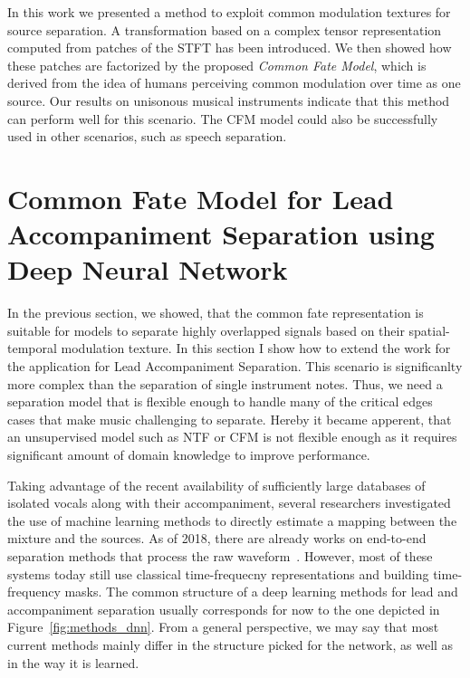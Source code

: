 In this work we presented a method to exploit common modulation textures for source separation. A transformation based on a complex tensor representation computed from patches of the STFT has been introduced. We then showed how these patches are factorized by the proposed \emph{Common Fate Model}, which is derived from the idea of humans perceiving common modulation over time as one source. Our results on unisonous musical instruments indicate that this method can perform well for this scenario. The CFM model could also be successfully used in other scenarios, such as speech separation.

\section{Common Fate Model for Lead Accompaniment Separation using Deep Neural Network}


In the previous section, we showed, that the common fate representation is suitable for models to separate highly overlapped signals based on their spatial-temporal modulation texture.
In this section I show how to extend the work for the application for Lead Accompaniment Separation.
This scenario is significanlty more complex than the separation of single instrument notes.
Thus, we need a separation model that is flexible enough to handle many of the critical edges cases that make music challenging to separate.
Hereby it became apperent, that an unsupervised model such as NTF or CFM is not flexible enough as it requires significant amount of domain knowledge to improve performance.

Taking advantage of the recent availability of sufficiently large databases of isolated vocals along with their accompaniment, several researchers investigated the use of machine learning methods to directly estimate a mapping between the mixture and the sources.
As of 2018, there are already works on end-to-end separation methods that process the raw waveform~\cite{venkataramani17}.
However, most of these systems today still use classical time-frequecny representations and building time-frequency masks.
The common structure of a deep learning methods for lead and accompaniment separation usually corresponds for now to the one depicted in Figure~\ref{fig:methods_dnn}. From a general perspective, we may say that most current methods mainly differ in the structure picked for the network, as well as in the way it is learned.

